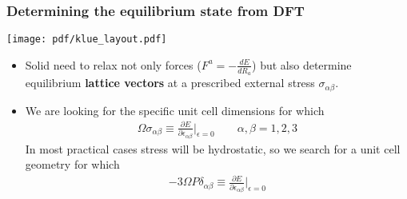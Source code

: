 \documentclass[10pt, handout]{beamer}
\begin{document}
\begin{frame}
	\frametitle{Determining the equilibrium state from DFT}
	\begin{center}
		\texttt{[image: pdf/klue\_layout.pdf]}
	\end{center}
	
	\begin{itemize}
		
		\item Solid need to relax not only forces ($F^a = -\frac{d E}{d R_a}$) but also determine equilibrium \textbf{lattice vectors} at a prescribed external stress $\sigma_{\alpha\beta}$.
		\item We are looking for the specific unit cell dimensions for which
		\begin{eqnarray*}
			\Omega\sigma_{\alpha\beta} \equiv \frac{\partial E}{\partial \epsilon_{\alpha \beta}}\Big|_{\epsilon = 0}
			\qquad \alpha,\beta = 1,2,3
		\end{eqnarray*}
		In most practical cases stress will be hydrostatic, so we search for a unit cell geometry for which 
		\begin{eqnarray*}
			-3\Omega P\delta_{\alpha\beta}\equiv \frac{\partial E}{\partial \epsilon_{\alpha \beta}}\Big|_{\epsilon = 0} 
		\end{eqnarray*}
	\end{itemize}
\end{frame}

\end{document}
